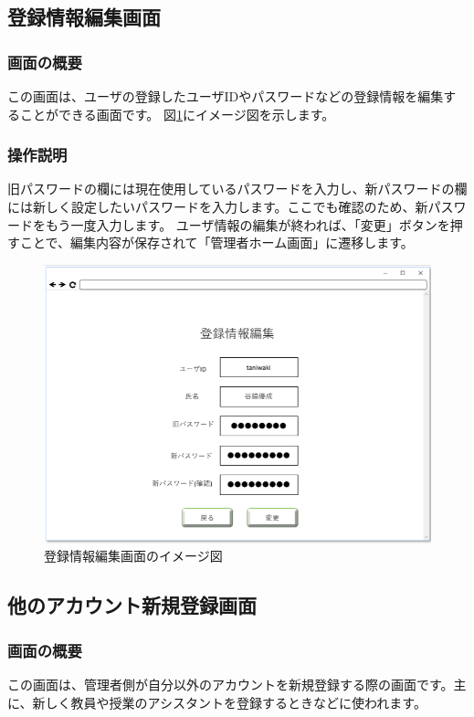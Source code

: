 \newpage

\subsection{登録情報編集画面}
\subsubsection{画面の概要}
この画面は、ユーザの登録したユーザIDやパスワードなどの登録情報を編集することができる画面です。
図\ref{fig:06}にイメージ図を示します。

\subsubsection{操作説明}
旧パスワードの欄には現在使用しているパスワードを入力し、新パスワードの欄には新しく設定したいパスワードを入力します。ここでも確認のため、新パスワードをもう一度入力します。
ユーザ情報の編集が終われば、「変更」ボタンを押すことで、編集内容が保存されて「管理者ホーム画面」に遷移します。

\begin{figure}[htbp]
  \begin{center}
    \includegraphics[width=0.7\linewidth,clip]{./img/06.png}
    \caption{登録情報編集画面のイメージ図}\label{fig:06}
  \end{center}
\end{figure}

\newpage

\subsection{他のアカウント新規登録画面}
\subsubsection{画面の概要}
この画面は、管理者側が自分以外のアカウントを新規登録する際の画面です。主に、新しく教員や授業のアシスタントを登録するときなどに使われます。

